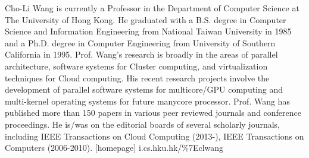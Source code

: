 \documentclass[10pt,journal,compsoc]{IEEEtran}
\begin{document}
\vspace{-.5in}
\begin{IEEEbiography}{Cho-Li Wang}
is currently a Professor in the Department of Computer Science at The
University of Hong Kong. He graduated with a B.S. degree in Computer Science and
Information Engineering from National Taiwan University in 1985 and a Ph.D.
degree in Computer Engineering from University of Southern California in 1995. Prof.
Wang’s research is broadly in the areas of parallel architecture, software systems for
Cluster computing, and virtualization techniques for Cloud computing. His recent
research projects involve the development of parallel software systems for
multicore/GPU computing and multi-kernel operating systems for future manycore
processor. Prof. Wang has published more than 150 papers in various peer reviewed
journals and conference proceedings. He is/was on the editorial boards of several scholarly
journals, including IEEE Transactions on Cloud Computing (2013-), IEEE
Transactions on Computers (2006-2010).
[homepage] i.cs.hku.hk/\%7Eclwang
\end{IEEEbiography}









\end{document}
